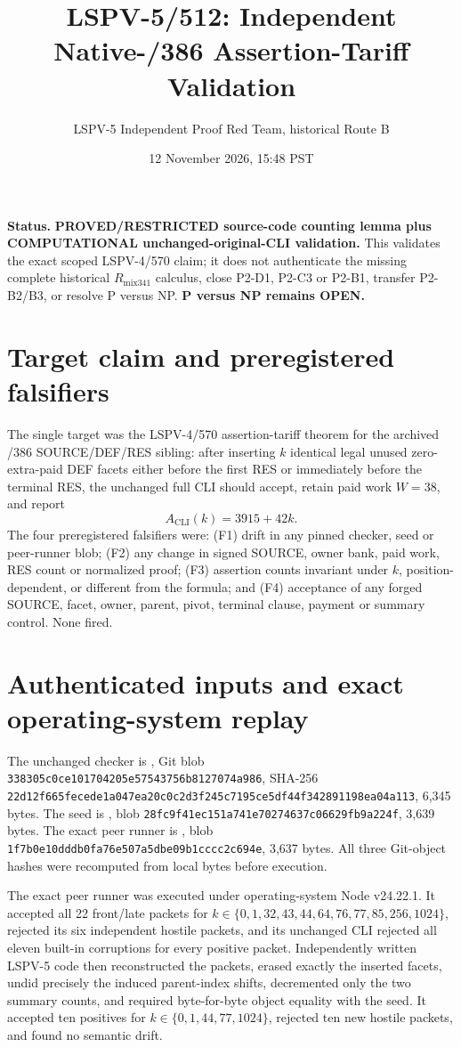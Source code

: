 \documentclass[11pt]{article}
\title{LSPV-5/512: Independent Native-/386 Assertion-Tariff Validation}
\author{LSPV-5 Independent Proof Red Team, historical Route B}
\date{12 November 2026, 15:48 PST}
\begin{document}
\maketitle

\noindent\textbf{Status.} \textbf{PROVED/RESTRICTED source-code counting lemma plus COMPUTATIONAL unchanged-original-CLI validation.}  This validates the exact scoped LSPV-4/570 claim; it does not authenticate the missing complete historical $R_{\mathrm{mix341}}$ calculus, close P2-D1, P2-C3 or P2-B1, transfer P2-B2/B3, or resolve P versus NP.  \textbf{P versus NP remains OPEN.}

\section*{Target claim and preregistered falsifiers}
The single target was the LSPV-4/570 assertion-tariff theorem for the archived /386 SOURCE/DEF/RES sibling: after inserting $k$ identical legal unused zero-extra-paid DEF facets either before the first RES or immediately before the terminal RES, the unchanged full CLI should accept, retain paid work $W=38$, and report
\[
 A_{\mathrm{CLI}}(k)=3915+42k.
\]
The four preregistered falsifiers were: (F1) drift in any pinned checker, seed or peer-runner blob; (F2) any change in signed SOURCE, owner bank, paid work, RES count or normalized proof; (F3) assertion counts invariant under $k$, position-dependent, or different from the formula; and (F4) acceptance of any forged SOURCE, facet, owner, parent, pivot, terminal clause, payment or summary control.  None fired.

\section*{Authenticated inputs and exact operating-system replay}
The unchanged checker is
, Git blob
\texttt{338305c0ce101704205e57543756b8127074a986}, SHA-256
\texttt{22d12f665fecede1a047ea20c0c2d3f245c7195ce5df44f342891198ea04a113}, 6,345 bytes.  The seed is
, blob
\texttt{28fc9f41ec151a741e70274637c06629fb9a224f}, 3,639 bytes.  The exact peer runner is
, blob
\texttt{1f7b0e10dddb0fa76e507a5dbe09b1cccc2c694e}, 3,637 bytes.  All three Git-object hashes were recomputed from local bytes before execution.

The exact peer runner was executed under operating-system Node v24.22.1.  It accepted all 22 front/late packets for $k\in\{0,1,32,43,44,64,76,77,85,256,1024\}$, rejected its six independent hostile packets, and its unchanged CLI rejected all eleven built-in corruptions for every positive packet.  Independently written LSPV-5 code then reconstructed the packets, erased exactly the inserted facets, undid precisely the induced parent-index shifts, decremented only the two summary counts, and required byte-for-byte object equality with the seed.  It accepted ten positives for $k\in\{0,1,44,77,1024\}$, rejected ten new hostile packets, and found no semantic drift.
\end{document}
